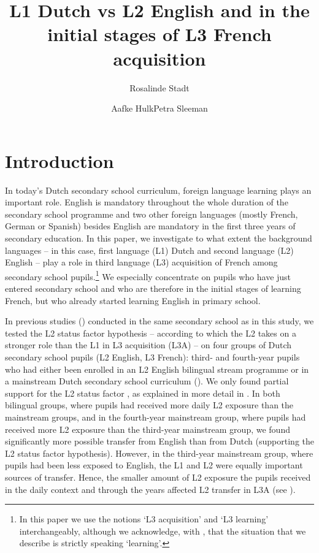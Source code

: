 \documentclass[output=paper,modfonts,nonflat, newtxmath]{langsci/langscibook}
\author{Rosalinde Stadt\affiliation{University of Amsterdam}\and Aafke Hulk\affiliation{University of Amsterdam}\lastand Petra Sleeman\affiliation{University of Amsterdam}}
\title{{L1} {Dutch} {vs} {L2} {English} {and} {in} {the} {initial} {stages} {of} {L3} {French} {acquisition} }
\begin{document}
\maketitle


\section{Introduction}%
\label{sec:stadt:1}

In today’s Dutch secondary school curriculum, foreign language learning plays an important role. English is mandatory throughout the whole duration of the secondary school programme and two other foreign languages (mostly French, German or Spanish) besides English are mandatory in the first three years of secondary education. In this paper, we investigate to what extent the background languages – in this case, first language (L1) Dutch and second language (L2) English – play a role in third language (L3) acquisition of French among secondary school pupils.\footnote{ \textrm{In this paper we use the notions ‘L3 acquisition’ and ‘L3 learning’ interchangeably, although we acknowledge, with \citet[fn 1]{BardelFalk2012}, that the situation that we describe is strictly speaking ‘learning’.}} We especially concentrate on pupils who have just entered secondary school and who are therefore in the initial stages of learning French, but who already started learning English in primary school.

  In previous studies (\citealt{StadtEtAl2016, StadtEtAl2018Exposure}) conducted in the same secondary school as in this study, we tested the L2 status factor hypothesis – according to which the L2 takes on a stronger role than the L1 in L3 acquisition (L3A) – on four groups of Dutch secondary school pupils (L2 English, L3 French): third- and fourth-year pupils who had either been enrolled in an L2 English bilingual stream programme or in a mainstream Dutch secondary school curriculum (\citealt{StadtEtAl2016, StadtEtAl2018Exposure}). We only found partial support for the L2 status factor \citep{BardelFalk2007, FalkBardel2011}, as explained in more detail in . In both bilingual groups, where pupils had received more daily L2 exposure than the mainstream groups, and in the fourth-year mainstream group, where pupils had received more L2 exposure than the third-year mainstream group, we found significantly more possible transfer from English than from Dutch (supporting the L2 status factor hypothesis). However, in the third-year mainstream group, where pupils had been less exposed to English, the L1 and L2 were equally important sources of transfer. Hence, the smaller amount of L2 exposure the pupils received in the daily context and through the years affected L2 transfer in L3A (see \citealt{Hammarberg2001, Hammarberg2009, Tremblay2006}).
\end{document}
